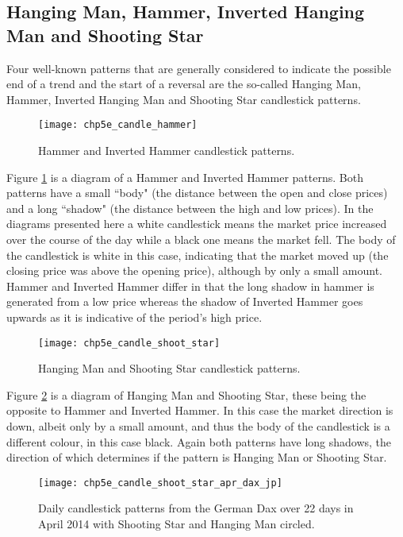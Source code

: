 \subsection{Hanging Man, Hammer, Inverted Hanging Man and Shooting Star}
Four well-known patterns that are generally considered to indicate the possible end of a trend and the start of a reversal are the so-called Hanging Man, Hammer, Inverted Hanging Man and Shooting Star candlestick patterns. 

\begin{figure}[tbph]
\centering
\texttt{[image: chp5e\_candle\_hammer]}
\caption[Hammer and Inverted Hammer candlestick patterns]{Hammer and Inverted Hammer candlestick patterns.}
\label{fig:chp5e:hammer}
\end{figure}

Figure \ref{fig:chp5e:hammer} is a diagram of a Hammer and Inverted Hammer patterns. Both patterns have a small \textquotedblleft body" (the distance between the open and close prices) and a long \textquotedblleft shadow" (the distance between the high and low prices). In the diagrams presented here a white candlestick means the market price increased over the course of the day while a black one means the market fell. The body of the candlestick is white in this case, indicating that the market moved up (the closing price was above the opening price), although by only a small amount. Hammer and Inverted Hammer differ in that the long shadow in hammer is generated from a low price whereas the shadow of Inverted Hammer goes upwards as it is indicative of the period's high price.

\begin{figure}[tbph]
\centering
\texttt{[image: chp5e\_candle\_shoot\_star]}
\caption[Hanging Man and Shooting Star candlestick patterns]{Hanging Man and Shooting Star candlestick patterns.}
\label{fig:chp5e:shoot_star}
\end{figure}

Figure \ref{fig:chp5e:shoot_star} is a diagram of Hanging Man and Shooting Star, these being the opposite to Hammer and Inverted Hammer. In this case the market direction is down, albeit only by a small amount, and thus the body of the candlestick is a different colour, in this case black. Again both patterns have long shadows, the direction of which determines if the pattern is Hanging Man or Shooting Star.

\begin{figure}[tbph]
\centering
\texttt{[image: chp5e\_candle\_shoot\_star\_apr\_dax\_jp]}
\caption [Dax candlestick patterns occurring in April 2014.]{Daily candlestick patterns from the German Dax over 22 days in April 2014 with Shooting Star and Hanging Man circled.}
\label{fig:chp5e:shoot_star_dax}
\end{figure}

